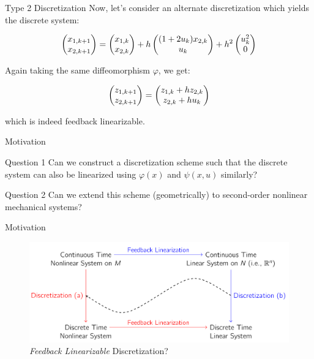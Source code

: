 \documentclass{beamer}
\begin{document}
\begin{frame}{Type 2 Discretization}
Now, let's consider an alternate discretization which yields the discrete system:

\begin{equation}
\begin{pmatrix}x_{1,k+1} \\ x_{2, k+1}\end{pmatrix} = \begin{pmatrix}x_{1,k} \\ x_{2,k}\end{pmatrix} + h\begin{pmatrix}(1+2u_k)x_{2,k} \\ u_k\end{pmatrix} + h^2 \begin{pmatrix}u_k^2 \\ 0\end{pmatrix}
\end{equation}

Again taking the same diffeomorphism $\varphi$, we get:

\begin{equation}
\begin{pmatrix}z_{1,k+1} \\ z_{2,k+1}\end{pmatrix} = \begin{pmatrix}z_{1,k} + hz_{2,k} \\ z_{2,k} + h u_k\end{pmatrix}
\end{equation}

which is indeed feedback linearizable.

\end{frame}

\begin{frame}{Motivation}

  \begin{block}{Question 1}
    Can we construct a discretization scheme such that the discrete system can also be linearized using $\varphi(x)$ and $\psi(x,u)$ similarly?
  \end{block}
  
  \begin{block}{Question 2}
    Can we extend this scheme (geometrically) to second-order nonlinear mechanical systems?
  \end{block}
  
\end{frame}

\begin{frame}{Motivation}
  \begin{figure}[h]
    \centering
    \includegraphics[width=\textwidth]{../Figures/feedback_lin.png}
    \caption{\textsl{Feedback Linearizable} Discretization?}
  \end{figure}
  
\end{frame}
\end{document}
